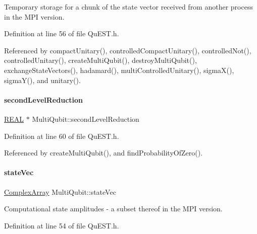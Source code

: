 Temporary storage for a chunk of the state vector received from another process in the M\+PI version. 



Definition at line 56 of file Qu\+E\+S\+T.\+h.



Referenced by compact\+Unitary(), controlled\+Compact\+Unitary(), controlled\+Not(), controlled\+Unitary(), create\+Multi\+Qubit(), destroy\+Multi\+Qubit(), exchange\+State\+Vectors(), hadamard(), multi\+Controlled\+Unitary(), sigma\+X(), sigma\+Y(), and unitary().

\mbox{\label{structMultiQubit_a3e859cefa146ec7b30464ab3d897930b}} 
\paragraph{\texorpdfstring{second\+Level\+Reduction}{secondLevelReduction}}
{\footnotesize\ttfamily \mbox{\hyperlink{QuEST__precision_8h_a4b654506f18b8bfd61ad2a29a7e38c25}{R\+E\+AL}} $\ast$ Multi\+Qubit\+::second\+Level\+Reduction}



Definition at line 60 of file Qu\+E\+S\+T.\+h.



Referenced by create\+Multi\+Qubit(), and find\+Probability\+Of\+Zero().

\mbox{\label{structMultiQubit_a45483190d6b01ef6b2f98f2bec9ab94f}} 
\paragraph{\texorpdfstring{state\+Vec}{stateVec}}
{\footnotesize\ttfamily \mbox{\hyperlink{structComplexArray}{Complex\+Array}} Multi\+Qubit\+::state\+Vec}



Computational state amplitudes -\/ a subset thereof in the M\+PI version. 



Definition at line 54 of file Qu\+E\+S\+T.\+h.



